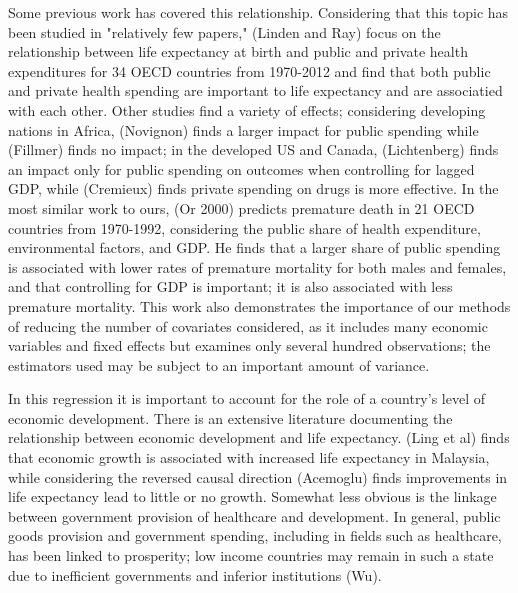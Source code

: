 \documentclass[12pt]{article}
\begin{document}
        Some previous work has covered this relationship. Considering that this topic has been studied in "relatively few papers," (Linden and Ray) focus on the relationship between life expectancy at birth and public and private health expenditures for 34 OECD countries from 1970-2012 and find that both public and private health spending are important to life expectancy and are associatied with each other. Other studies find a variety of effects; considering developing nations in Africa, (Novignon) finds a larger impact for public spending while (Fillmer) finds no impact; in the developed US and Canada, (Lichtenberg) finds an impact only for public spending on outcomes when controlling for lagged GDP, while (Cremieux) finds private spending on drugs is more effective. In the most similar work to ours, (Or 2000) predicts premature death in 21 OECD countries from 1970-1992, considering the public share of health expenditure, environmental factors, and GDP. He finds that a larger share of public spending is associated with lower rates of premature mortality for both males and females, and that controlling for GDP is important; it is also associated with less premature mortality. This work also demonstrates the importance of our methods of reducing the number of covariates considered, as it includes many economic variables and fixed effects but examines only several hundred observations; the estimators used may be subject to an important amount of variance.

        In this regression it is important to account for the role of a country's level of economic development. There is an extensive literature documenting the relationship between economic development and life expectancy. (Ling et al) finds that economic growth is associated with increased life expectancy in Malaysia, while considering the reversed causal direction (Acemoglu) finds improvements in life expectancy lead to little or no growth. Somewhat less obvious is the linkage between government provision of healthcare and development. In general, public goods provision and government spending, including in fields such as healthcare, has been linked to prosperity; low income countries may remain in such a state due to inefficient governments and inferior institutions (Wu).
\end{document}
